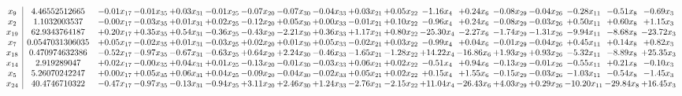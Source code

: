 \documentclass[9pt]{article}
\begin{document}
 \[\begin{array}{c| c c@{\hskip 2pt} c@{\hskip 2pt} c@{\hskip 2pt} c@{\hskip 2pt} c@{\hskip 2pt} c@{\hskip 2pt} c@{\hskip 2pt} c@{\hskip 2pt} c@{\hskip 2pt} c@{\hskip 2pt} c@{\hskip 2pt} c@{\hskip 2pt} c@{\hskip 2pt} c@{\hskip 2pt} c@{\hskip 2pt} c@{\hskip 2pt} }
 x_{9}   &  4.46552512665 & -0.01 x_{17} & -0.01 x_{35} & +  0.03 x_{31} & -0.01 x_{25} & -0.07 x_{20} & -0.07 x_{30} & -0.04 x_{33} & +  0.03 x_{21} & +  0.05 x_{22} & -1.16 x_{4} & +  0.24 x_{6} & -0.08 x_{29} & -0.04 x_{26} & -0.28 x_{11} & -0.51 x_{8} & -0.69 x_{3}\\
 x_{2}   &  1.1032003537 & -0.00 x_{17} & -0.03 x_{35} & +  0.01 x_{31} & +  0.02 x_{25} & -0.12 x_{20} & +  0.05 x_{30} & +  0.00 x_{33} & -0.01 x_{21} & +  0.10 x_{22} & -0.96 x_{4} & +  0.24 x_{6} & -0.08 x_{29} & -0.03 x_{26} & +  0.50 x_{11} & +  0.60 x_{8} & +  1.15 x_{3}\\
 x_{19}   &  62.9343764187 & +  0.20 x_{17} & +  0.35 x_{35} & +  0.54 x_{31} & -0.36 x_{25} & -0.43 x_{20} & -2.21 x_{30} & +  0.36 x_{33} & +  1.17 x_{21} & +  0.80 x_{22} & -25.30 x_{4} & -2.27 x_{6} & -1.74 x_{29} & -1.31 x_{26} & -9.94 x_{11} & -8.68 x_{8} & -23.72 x_{3}\\
 x_{7}   &  0.0547031306035 & +  0.05 x_{17} & -0.02 x_{35} & +  0.01 x_{31} & -0.03 x_{25} & +  0.02 x_{20} & +  0.01 x_{30} & +  0.05 x_{33} & -0.02 x_{21} & +  0.03 x_{22} & -0.99 x_{4} & +  0.04 x_{6} & -0.01 x_{29} & -0.04 x_{26} & +  0.45 x_{11} & +  0.14 x_{8} & +  0.82 x_{3}\\
 x_{18}   &  0.470974632386 & -0.52 x_{17} & -0.97 x_{35} & -0.67 x_{31} & -0.63 x_{25} & +  0.64 x_{20} & +  2.24 x_{30} & -0.46 x_{33} & -1.65 x_{21} & -1.28 x_{22} & + 14.22 x_{4} & -16.86 x_{6} & +  1.93 x_{29} & +  0.93 x_{26} & -5.32 x_{11} & -8.89 x_{8} & + 25.35 x_{3}\\
 x_{14}   &  2.919289047 & +  0.02 x_{17} & -0.00 x_{35} & +  0.04 x_{31} & +  0.01 x_{25} & -0.13 x_{20} & -0.01 x_{30} & -0.03 x_{33} & +  0.06 x_{21} & +  0.02 x_{22} & -0.51 x_{4} & +  0.94 x_{6} & -0.13 x_{29} & -0.01 x_{26} & -0.55 x_{11} & +  0.21 x_{8} & -0.10 x_{3}\\
 x_{5}   &  5.26070242247 & +  0.00 x_{17} & +  0.05 x_{35} & +  0.06 x_{31} & +  0.04 x_{25} & -0.09 x_{20} & -0.04 x_{30} & -0.02 x_{33} & +  0.05 x_{21} & +  0.02 x_{22} & +  0.15 x_{4} & +  1.55 x_{6} & -0.15 x_{29} & -0.03 x_{26} & -1.03 x_{11} & -0.54 x_{8} & -1.45 x_{3}\\
 x_{24}   &  40.4746710322 & -0.47 x_{17} & -0.97 x_{35} & -0.13 x_{31} & -0.94 x_{25} & +  3.11 x_{20} & +  2.46 x_{30} & +  1.24 x_{33} & -2.76 x_{21} & -2.15 x_{22} & + 11.04 x_{4} & -26.43 x_{6} & +  4.03 x_{29} & +  0.29 x_{26} & -10.20 x_{11} & -29.84 x_{8} & + 16.45 x_{3}\\

\end{array}\]
\end{document}
